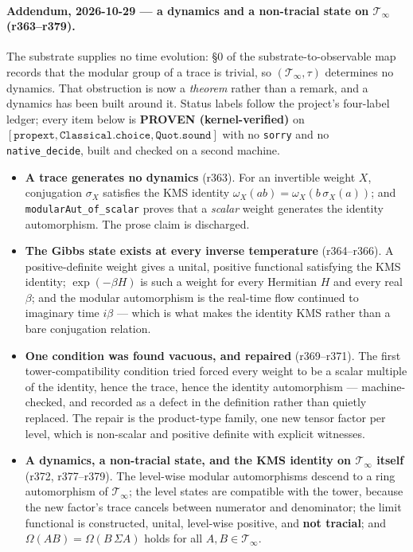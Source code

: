 \paragraph{Addendum, 2026-10-29 --- a dynamics and a non-tracial state on
\texorpdfstring{$\mathcal{T}_\infty$}{T-infinity} (r363--r379).}
The substrate supplies no time evolution: §0 of the substrate-to-observable map
records that the modular group of a trace is trivial, so $(\mathcal{T}_\infty,
\tau)$ determines no dynamics. That obstruction is now a \emph{theorem} rather
than a remark, and a dynamics has been built around it. Status labels follow the
project's four-label ledger; every item below is \textbf{PROVEN
(kernel-verified)} on $[\texttt{propext}, \texttt{Classical.choice},
\texttt{Quot.sound}]$ with no \texttt{sorry} and no \texttt{native\_decide},
built and checked on a second machine.

\begin{itemize}
\item \textbf{A trace generates no dynamics} (r363). For an invertible weight
$X$, conjugation $\sigma_X$ satisfies the KMS identity
$\omega_X(ab) = \omega_X(b\,\sigma_X(a))$; and
\texttt{modularAut\_of\_scalar} proves that a \emph{scalar} weight generates
the identity automorphism. The prose claim is discharged.
\item \textbf{The Gibbs state exists at every inverse temperature} (r364--r366).
A positive-definite weight gives a unital, positive functional satisfying the
KMS identity; $\exp(-\beta H)$ is such a weight for every Hermitian $H$ and
every real $\beta$; and the modular automorphism is the real-time flow continued
to imaginary time $i\beta$ --- which is what makes the identity KMS rather than
a bare conjugation relation.
\item \textbf{One condition was found vacuous, and repaired} (r369--r371). The
first tower-compatibility condition tried forced every weight to be a scalar
multiple of the identity, hence the trace, hence the identity automorphism ---
machine-checked, and recorded as a defect in the definition rather than
quietly replaced. The repair is the product-type family, one new tensor factor
per level, which is non-scalar and positive definite with explicit witnesses.
\item \textbf{A dynamics, a non-tracial state, and the KMS identity on
$\mathcal{T}_\infty$ itself} (r372, r377--r379). The level-wise modular
automorphisms descend to a ring automorphism of $\mathcal{T}_\infty$; the level
states are compatible with the tower, because the new factor's trace cancels
between numerator and denominator; the limit functional is constructed, unital,
level-wise positive, and \textbf{not tracial}; and
$\Omega(AB) = \Omega(B\,\Sigma A)$ holds for all $A, B \in
\mathcal{T}_\infty$.
\end{itemize}

